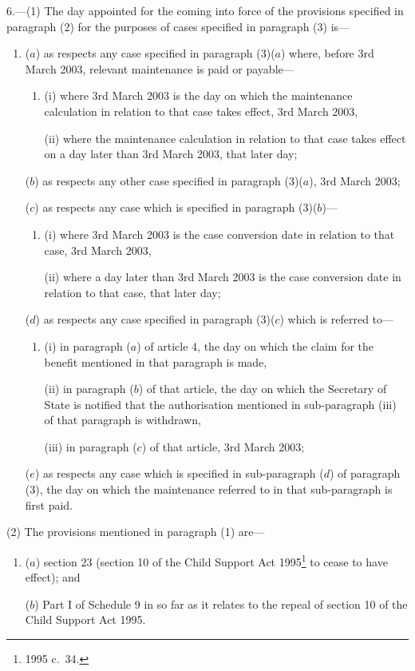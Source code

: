 \documentclass[12pt,a4paper]{article}
\begin{document}
6.---(1)  The day appointed for the coming into force of the provisions specified in paragraph (2) for the purposes of cases specified in paragraph (3) is—
\begin{enumerate}\item[]
($a$) as respects any case specified in paragraph (3)($a$)  where, before 3rd March 2003, relevant maintenance is paid or payable—
\begin{enumerate}\item[]
(i) where 3rd March 2003 is the day on which the maintenance calculation in relation to that case takes effect, 3rd March 2003,

(ii) where the maintenance calculation in relation to that case takes effect on a day later than 3rd March 2003, that later day;
\end{enumerate}

($b$) as respects any other case specified in paragraph (3)($a$), 3rd March 2003;

($c$) as respects any case which is specified in paragraph (3)($b$)—
\begin{enumerate}\item[]
(i) where 3rd March 2003 is the case conversion date in relation to that case, 3rd March 2003,

(ii) where a day later than 3rd March 2003 is the case conversion date in relation to that case, that later day;
\end{enumerate}

($d$) as respects any case specified in paragraph (3)($c$)  which is referred to—
\begin{enumerate}\item[]
(i) in paragraph ($a$)  of article 4, the day on which the claim for the benefit mentioned in that paragraph is made,

(ii) in paragraph ($b$)  of that article, the day on which the Secretary of State is notified that the authorisation mentioned in sub-paragraph (iii)  of that paragraph is withdrawn,

(iii) in paragraph ($c$)  of that article, 3rd March 2003;
\end{enumerate}

($e$) as respects any case which is specified in sub-paragraph ($d$)  of paragraph (3), the day on which the maintenance referred to in that sub-paragraph is first paid.
\end{enumerate}

(2) The provisions mentioned in paragraph (1) are—
\begin{enumerate}\item[]
($a$) section 23 (section 10 of the Child Support Act 1995\footnote{1995 c.\ 34.} to cease to have effect); and

($b$) Part I of Schedule 9 in so far as it relates to the repeal of section 10 of the Child Support Act 1995.
\end{enumerate}
\end{document}
